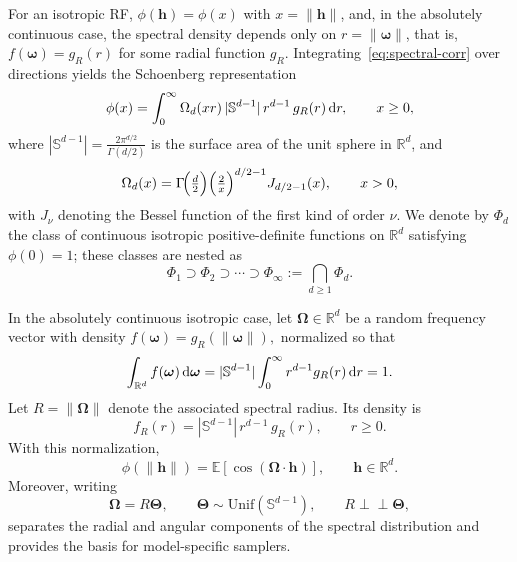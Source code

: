 \documentclass[
  12pt]{article}
\begin{document}
For an isotropic RF, $\phi(\mathbf{h})=\phi(x)$ with $x=\|\mathbf{h}\|$, and, in the absolutely continuous case, the spectral density depends only on $r=\|\boldsymbol{\omega}\|$, that is,
$
f(\boldsymbol{\omega})=g_R(r)
$
for some radial function $g_R$.
Integrating~\eqref{eq:spectral-corr} over directions yields the Schoenberg representation \citep{Schoenberg1938b}
\begin{equation}\label{eq:schoenberg}
\phi(x)=\int_0^\infty \Omega_d(xr)\,|\mathbb{S}^{d-1}|\,r^{d-1}\,g_R(r)\,{\rm d}r,
\qquad x\ge 0,
\end{equation}
where $|\mathbb{S}^{d-1}|=\frac{2\pi^{d/2}}{\Gamma(d/2)}$ is the surface area of the unit sphere in $\mathbb{R}^d$, and
\[
\Omega_d(x)=\Gamma\!\Bigl(\tfrac{d}{2}\Bigr)\Bigl(\tfrac{2}{x}\Bigr)^{d/2-1}J_{d/2-1}(x),
\qquad x>0,
\]
with $J_{\nu}$ denoting the Bessel function of the first kind of order $\nu$.
We denote by $\Phi_d$ the class of continuous isotropic positive-definite functions on $\mathbb{R}^d$ satisfying $\phi(0)=1$; these classes are nested as
\[
\Phi_1 \supset \Phi_2 \supset \cdots \supset \Phi_\infty := \bigcap_{d\ge1}\Phi_d.
\]

In the absolutely continuous isotropic case, let $\boldsymbol{\Omega}\in\mathbb{R}^d$ be a random frequency vector with density
$
f(\boldsymbol{\omega})=g_R(\|\boldsymbol{\omega}\|),
$
normalized so that
\[
\int_{\mathbb{R}^d}f(\boldsymbol{\omega})\,{\rm d}\boldsymbol{\omega}
=
|\mathbb{S}^{d-1}|\int_0^\infty r^{d-1}g_R(r)\,{\rm d}r
=1.
\]
Let $R=\|\boldsymbol{\Omega}\|$ denote the associated spectral radius.
Its density is
\begin{equation}\label{eq:fR}
f_R(r)=|\mathbb{S}^{d-1}|\,r^{d-1}\,g_R(r),
\qquad r\ge 0.
\end{equation}
With this normalization,
\begin{equation}\label{eq:spectral-expectation}
\phi(\|\mathbf{h}\|)
=
\mathbb{E}\!\left[\cos(\boldsymbol{\Omega}\cdot\mathbf{h})\right],
\qquad \mathbf{h}\in\mathbb{R}^d.
\end{equation}
Moreover, writing
\[
\boldsymbol{\Omega}=R\boldsymbol{\Theta},
\qquad
\boldsymbol{\Theta}\sim\mathrm{Unif}(\mathbb{S}^{d-1}),
\qquad
R\perp\!\!\!\perp\boldsymbol{\Theta},
\]
separates the radial and angular components of the spectral distribution and provides the basis for model-specific samplers.
\end{document}

